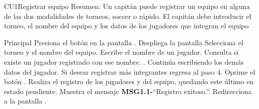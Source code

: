 


	\begin{UseCase}{CU1}{Registrar equipo}{
		Resumen: Un capitán puede registrar un equipo en alguna de las dos modalidades de torneos, soccer o rápido. El capitán debe introducir el torneo, el nombre del equipo y los datos de los jugadores que integran el equipo	}
	\end{UseCase}
	\newpage
	\begin{UCtrayectoria}{Principal}
	\UCpaso[\UCactor] Presiona el botón  en la pantalla .
	\UCpaso Despliega la pantalla  
	\UCpaso[\UCactor] Selecciona el torneo y el nombre del equipo.
	\UCpaso[\UCactor] Escribe el nombre de un jugador.
	\UCpaso Consulta si existe un jugador registrado con ese nombre. .
    \UCpaso[\UCactor] Continúa escribiendo los demás datos del jugador.
    \UCpaso[\UCactor] Si desear registrar más integrantes regresa al paso 4.
   	\UCpaso[\UCactor] Oprime el botón .   
    \UCpaso Realiza el registro de los jugadores y del equipo, quedando este último en estado pendiente.
	\UCpaso Muestra el mensaje {\bf MSG1.1-}``Registro exitoso.''.
	\UCpaso Redirecciona a la pantalla .
\end{UCtrayectoria}

